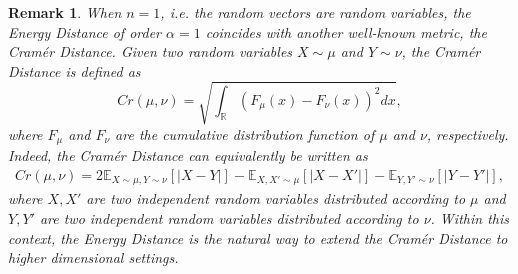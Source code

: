 \documentclass{article}
\newcommand{\fer}[1]{(\ref{#1})}
\def \erre{\mathbb{R}}
\newtheorem{remark}{Remark}
\begin{document}
% 


% 
% 




\begin{remark}
\label{rmrk:gini_energy_onedim}
    When $n=1$, \textit{i.e.} the random vectors are random variables, the Energy Distance of order $\alpha=1$ coincides with another well-known metric, the Cramér Distance.
    Given two random variables $X\sim\mu$ and $Y\sim\nu$, the Cramér Distance is defined as
    \begin{equation}
        \label{eq:Cramér_def}
        Cr(\mu,\nu)=\sqrt{\int_{\erre}(F_\mu(x)-F_\nu(x))^2dx},
    \end{equation}
    where $F_\mu$ and $F_\nu$ are the cumulative distribution function of $\mu$ and $\nu$, respectively.
    Indeed, the Cramér Distance can equivalently be written as
    \begin{align*}
        Cr(\mu,\nu)=2\mathbb{E}_{X\sim \mu, Y\sim \nu}[|X-Y|]-\mathbb{E}_{X,X'\sim \mu}[|X-X'|]-\mathbb{E}_{Y,Y'\sim \nu}[|Y-Y'|],
    \end{align*}
    where $X,X'$ are two independent random variables distributed according to $\mu$ and $Y,Y'$ are two independent random variables distributed according to $\nu$.
    Within this context, the Energy Distance is the natural way to extend the Cramér Distance to higher dimensional settings.\cite{Sze89,Sze03}


\end{remark}
\end{document}
